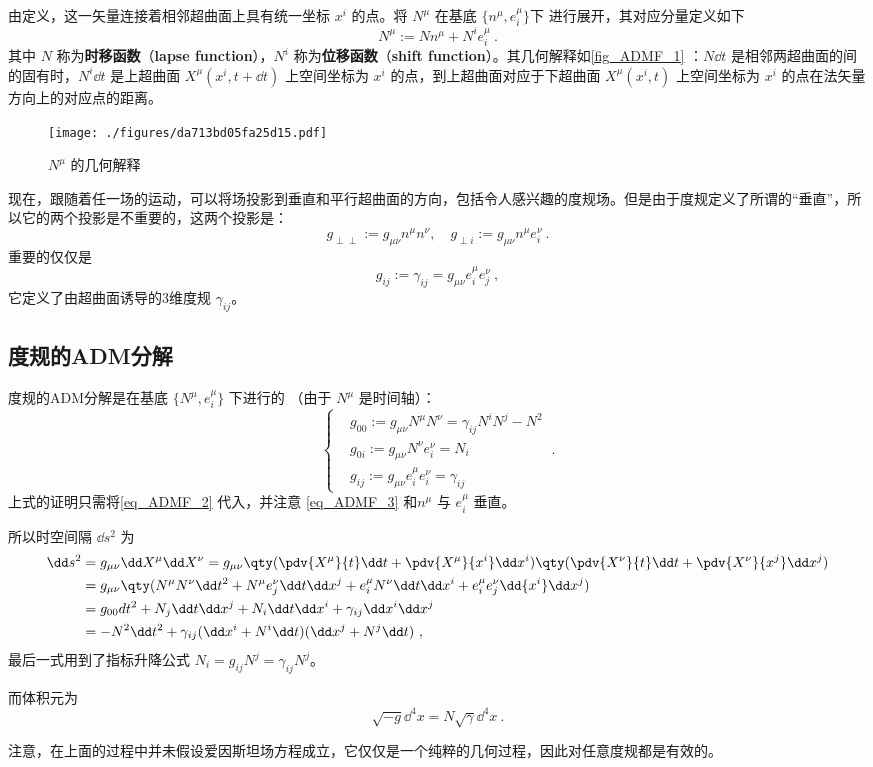 由定义，这一矢量连接着相邻超曲面上具有统一坐标 $x^i$ 的点。将 $N^\mu$ 在基底 $\{n^\mu,e^\mu_i\}$下 进行展开，其对应分量定义如下
\begin{equation}\label{eq_ADMF_2}
N^\mu:=Nn^\mu+N^ie^\mu_i~.
\end{equation}
其中 $N$ 称为\textbf{时移函数}（\textbf{lapse function}），$N^i$ 称为\textbf{位移函数}（\textbf{shift function}）。其几何解释如\autoref{fig_ADMF_1} ：$N\dd t$ 是相邻两超曲面的间的固有时，$N^i\dd t$ 是上超曲面 $X^\mu(x^i,t+\dd t)$ 上空间坐标为 $x^i$ 的点，到上超曲面对应于下超曲面 $X^\mu(x^i,t)$ 上空间坐标为 $x^i$ 的点在法矢量方向上的对应点的距离。
\begin{figure}[ht]
\centering
\texttt{[image: ./figures/da713bd05fa25d15.pdf]}
\caption{$N^\mu$ 的几何解释} \label{fig_ADMF_1}
\end{figure}

现在，跟随着任一场的运动，可以将场投影到垂直和平行超曲面的方向，包括令人感兴趣的度规场。但是由于度规定义了所谓的“垂直”，所以它的两个投影是不重要的，这两个投影是：
\begin{equation}
g_{\perp\perp}:=g_{\mu\nu}n^{\mu}n^{\nu},\quad g_{\perp i}:=g_{\mu\nu}n^{\mu}e^{\nu}_i~.
\end{equation}
重要的仅仅是
\begin{equation}\label{eq_ADMF_3}
g_{ij}:=\gamma_{ij}=g_{\mu\nu}e^{\mu}_ie^{\nu}_j~,
\end{equation}
它定义了由超曲面诱导的3维度规 $\gamma_{ij}$。
\subsection{度规的ADM分解}
度规的ADM分解是在基底 $\{N^{\mu},e^{\mu}_i\}$ 下进行的 （由于 $N^{\mu}$ 是时间轴）：
\begin{equation}
\left\{\begin{aligned}
&g_{00}:=g_{\mu\nu}N^{\mu}N^{\nu}=\gamma_{ij}N^iN^j-N^2\\
&g_{0i}:=g_{\mu\nu}N^{\nu}e^{\nu}_i=N_i\\
&g_{ij}:=g_{\mu\nu}e^{\mu}_ie^{\nu}_i=\gamma_{ij}
\end{aligned}\right.~.
\end{equation}
上式的证明只需将\autoref{eq_ADMF_2} 代入，并注意 \autoref{eq_ADMF_3} 和$n^\mu$ 与 $e^{\mu}_i$ 垂直。

所以时空间隔 $\dd s^2$ 为
\begin{equation}
\begin{aligned}
\dd s^2&=g_{\mu\nu}\dd X^\mu\dd X^\nu=g_{\mu\nu}\qty(\pdv{X^\mu}{t}\dd t+\pdv{X^\mu}{x^i}\dd x^i)\qty(\pdv{X^\nu}{t}\dd t+\pdv{X^\nu}{x^j}\dd x^j)\\
&=g_{\mu\nu}\qty(N^\mu N^\nu\dd t^2+N^\mu e^\nu_j\dd t\dd x^j+e^\mu_iN^\nu\dd t\dd x^i+e^{\mu}_ie^{\nu}_j\dd {x^i}\dd x^j)\\
&=g_{00}dt^2+N_j\dd t\dd x^j+N_i\dd t\dd x^i+\gamma_{ij}\dd x^i\dd x^j\\
&=-N^2\dd t^2+\gamma_{ij}(\dd x^i+N^i\dd t)(\dd x^j+N^j\dd t)~,
\end{aligned}
\end{equation}
最后一式用到了指标升降公式 $N_i=g_{ij}N^j=\gamma_{ij}N^j$。

而体积元为
\begin{equation}\label{eq_ADMF_4}
\sqrt{-g}{\dd}^4 x=N\sqrt{\gamma}{\dd}^4x~.
\end{equation}

注意，在上面的过程中并未假设爱因斯坦场方程成立，它仅仅是一个纯粹的几何过程，因此对任意度规都是有效的。